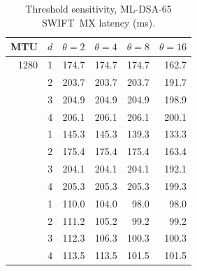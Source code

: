 \documentclass[preprint,12pt]{elsarticle}
\newcommand{\ms}{\,ms\xspace}
\newcommand{\Mbits}{\,Mbit/s\xspace}
\begin{document}
\begin{table}[!htbp]\centering\small
\caption{Model only: certificate chains with different algorithms for the leaf key and for the CA keys (SWIFT~MX, cold, mutual TLS, 100\Mbits, 30\ms RTT, MTU 1\,500, window 10, $\pi=0$). Chain bytes: one peer's certificate list; segments: the whole transaction; latency at depth 1 and 4 and its increase (ms). The key exchange is post-quantum in all rows (ML-KEM-768, or X25519MLKEM768 with a classical leaf). ``Post-quantum authentication'': which signatures of the chain resist a quantum adversary; only the first row does for the whole chain. No measurement covers mixed chains. Rows 1 and 4 equal the single-algorithm model of the main sweep.}
\label{tab:mixed}
\end{table}


\begin{table}[!htbp]\centering\small
\caption{Threshold sensitivity, ML-DSA-65 SWIFT~MX latency (ms).}
\label{tab:threshold}
\begin{tabular}{@{}rrrrrr@{}}
\toprule
MTU & $d$ & $\theta{=}2$ & $\theta{=}4$ & $\theta{=}8$ & $\theta{=}16$ \\
\midrule
1280 & 1 & 174.7 & 174.7 & 174.7 & 162.7 \\
 & 2 & 203.7 & 203.7 & 203.7 & 191.7 \\
 & 3 & 204.9 & 204.9 & 204.9 & 198.9 \\
 & 4 & 206.1 & 206.1 & 206.1 & 200.1 \\
\addlinespace
1500 & 1 & 145.3 & 145.3 & 139.3 & 133.3 \\
 & 2 & 175.4 & 175.4 & 175.4 & 163.4 \\
 & 3 & 204.1 & 204.1 & 204.1 & 192.1 \\
 & 4 & 205.3 & 205.3 & 205.3 & 199.3 \\
\addlinespace
9000 & 1 & 110.0 & 104.0 & 98.0 & 98.0 \\
 & 2 & 111.2 & 105.2 & 99.2 & 99.2 \\
 & 3 & 112.3 & 106.3 & 100.3 & 100.3 \\
 & 4 & 113.5 & 113.5 & 101.5 & 101.5 \\
\bottomrule
\end{tabular}
\end{table}
\end{document}
